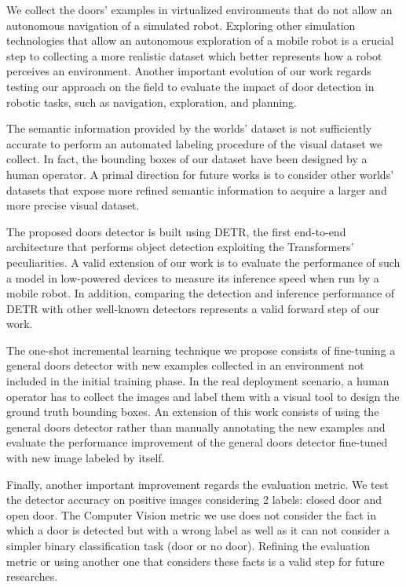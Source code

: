 We collect the doors' examples in virtualized environments that do not allow an autonomous navigation of a simulated robot. Exploring other simulation technologies that allow an autonomous exploration of a mobile robot is a crucial step to collecting a more realistic dataset which better represents how a robot perceives an environment. Another important evolution of our work regards testing our approach on the field to evaluate the impact of door detection in robotic tasks, such as navigation, exploration, and planning.

The semantic information provided by the worlds' dataset is not sufficiently accurate to perform an automated labeling procedure of the visual dataset we collect. In fact, the bounding boxes of our dataset have been designed by a human operator. A primal direction for future works is to consider other worlds' datasets that expose more refined semantic information to acquire a larger and more precise visual dataset.

The proposed doors detector is built using DETR, the first end-to-end architecture that performs object detection exploiting the Transformers' peculiarities. A valid extension of our work is to evaluate the performance of such a model in low-powered devices to measure its inference speed when run by a mobile robot. In addition, comparing the detection and inference performance of DETR with other well-known detectors represents a valid forward step of our work. 

The one-shot incremental learning technique we propose consists of fine-tuning a general  doors detector with new examples collected in an environment not included in the initial training phase. In the real deployment scenario, a human operator has to collect the images and label them with a visual tool to design the ground truth bounding boxes. An extension of this work consists of using the general doors detector rather than manually annotating the new examples and evaluate the performance improvement of the general doors detector fine-tuned with new image labeled by itself.

Finally, another important improvement regards the evaluation metric. We test the detector 
accuracy on positive images considering 2 labels: closed door and open door. The Computer Vision metric we use does not consider the fact in which a door is detected but with a wrong label as well as it can not consider a simpler binary classification task (door or no door). Refining the evaluation metric or using another one that considers these facts is a valid step for future researches.



